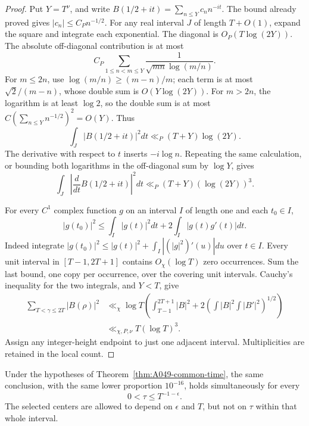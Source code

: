 \begin{proof}
Put \(Y=T^\nu\), and write
\(B(1/2+it)=\sum_{n\le Y}c_n n^{-it}\). The bound already
proved gives \(|c_n|\le C_Pn^{-1/2}\).
For any real interval \(J\) of length \(T+O(1)\), expand the
square and integrate each exponential. The diagonal is
\(O_P(T\log(2Y))\). The absolute off-diagonal contribution
is at most
\[
 C_P\sum_{1\le n<m\le Y}
             \frac1{\sqrt{mn}\log(m/n)}.
\]
For \(m\le2n\), use
\(\log(m/n)\ge(m-n)/m\); each term is at most
\(\sqrt2/(m-n)\), whose double sum is \(O(Y\log(2Y))\).
For \(m>2n\), the logarithm is at least \(\log2\), so the
double sum is at most
\(C(\sum_{n\le Y}n^{-1/2})^2=O(Y)\).
Thus
\[
 \int_J |B(1/2+it)|^2dt
                       \ll_P (T+Y)\log(2Y).
\]
The derivative with respect to \(t\) inserts \(-i\log n\).
Repeating the same calculation, or bounding both logarithms
in the off-diagonal sum by \(\log Y\), gives
\[
 \int_J \left|\frac{d}{dt}B(1/2+it)\right|^2dt
                       \ll_P (T+Y)(\log(2Y))^3.
\]

For every \(C^1\) complex function \(g\) on an interval
\(I\) of length one and each \(t_0\in I\),
\[
 |g(t_0)|^2\le
       \int_I|g(t)|^2dt+2\int_I|g(t)g'(t)|dt.
\]
Indeed integrate
\(|g(t_0)|^2\le |g(t)|^2+\int_I|(|g|^2)'(u)|du\)
over \(t\in I\).
Every unit interval in \([T-1,2T+1]\) contains
\(O_\chi(\log T)\) zero occurrences. Sum the last bound,
one copy per occurrence, over the covering unit intervals.
Cauchy's inequality for the two integrals, and \(Y<T\),
give
\[
 \begin{aligned}
 \sum_{T<\gamma\le2T}|B(\rho)|^2
 &\ll_\chi\log T
    \left(\int_{T-1}^{2T+1}|B|^2+
              2\left(\int|B|^2\int|B'|^2\right)^{1/2}\right)\\
 &\ll_{\chi,P,\nu}T(\log T)^3.
 \end{aligned}
\]
Assign any integer-height endpoint to just one adjacent
interval. Multiplicities are retained in the local count.
\end{proof}

\begin{corollary}
\label{cor:A049-inverse-height}
Under the hypotheses of Theorem~\ref{thm:A049-common-time},
the same conclusion, with the same lower proportion
\(10^{-16}\), holds simultaneously for every
\[
                        0<\tau\le T^{-1-\epsilon}.
\]
The selected centers are allowed to depend on
\(\epsilon\) and \(T\), but not on \(\tau\) within that
whole interval.
\end{corollary}

